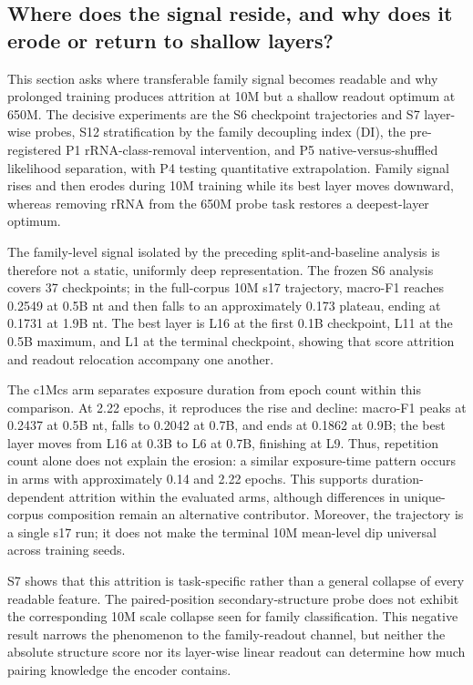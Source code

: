 \hypertarget{where-does-the-signal-reside-and-why-does-it-erode-or-return-to-shallow-layers}{%
\subsection{Where does the signal reside, and why does it erode or return to shallow layers?}\label{where-does-the-signal-reside-and-why-does-it-erode-or-return-to-shallow-layers}}

This section asks where transferable family signal becomes readable and why prolonged training produces attrition at 10M but a shallow readout optimum at 650M. The decisive experiments are the S6 checkpoint trajectories and S7 layer-wise probes, S12 stratification by the family decoupling index (DI), the pre-registered P1 rRNA-class-removal intervention, and P5 native-versus-shuffled likelihood separation, with P4 testing quantitative extrapolation. Family signal rises and then erodes during 10M training while its best layer moves downward, whereas removing rRNA from the 650M probe task restores a deepest-layer optimum.

The family-level signal isolated by the preceding split-and-baseline analysis is therefore not a static, uniformly deep representation. The frozen S6 analysis covers 37 checkpoints; in the full-corpus 10M s17 trajectory, macro-F1 reaches 0.2549 at 0.5B nt and then falls to an approximately 0.173 plateau, ending at 0.1731 at 1.9B nt. The best layer is L16 at the first 0.1B checkpoint, L11 at the 0.5B maximum, and L1 at the terminal checkpoint, showing that score attrition and readout relocation accompany one another.

The c1Mcs arm separates exposure duration from epoch count within this comparison. At 2.22 epochs, it reproduces the rise and decline: macro-F1 peaks at 0.2437 at 0.5B nt, falls to 0.2042 at 0.7B, and ends at 0.1862 at 0.9B; the best layer moves from L16 at 0.3B to L6 at 0.7B, finishing at L9. Thus, repetition count alone does not explain the erosion: a similar exposure-time pattern occurs in arms with approximately 0.14 and 2.22 epochs. This supports duration-dependent attrition within the evaluated arms, although differences in unique-corpus composition remain an alternative contributor. Moreover, the trajectory is a single s17 run; it does not make the terminal 10M mean-level dip universal across training seeds.

S7 shows that this attrition is task-specific rather than a general collapse of every readable feature. The paired-position secondary-structure probe does not exhibit the corresponding 10M scale collapse seen for family classification. This negative result narrows the phenomenon to the family-readout channel, but neither the absolute structure score nor its layer-wise linear readout can determine how much pairing knowledge the encoder contains.

